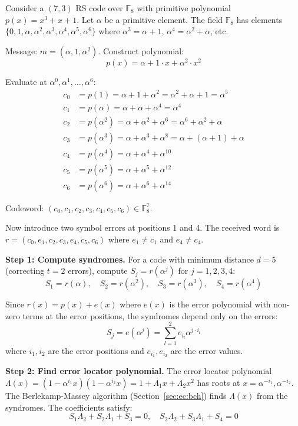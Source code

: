 \begin{example}
Consider a $(7,3)$ RS code over $\mathbb{F}_8$ with primitive polynomial $p(x) = x^3 + x + 1$. Let $\alpha$ be a primitive element. The field $\mathbb{F}_8$ has elements $\{0, 1, \alpha, \alpha^2, \alpha^3, \alpha^4, \alpha^5, \alpha^6\}$ where $\alpha^3 = \alpha + 1$, $\alpha^4 = \alpha^2 + \alpha$, etc.

Message: $m = (\alpha, 1, \alpha^2)$. Construct polynomial:
\[
p(x) = \alpha + 1\cdot x + \alpha^2 \cdot x^2
\]

Evaluate at $\alpha^0, \alpha^1, \dots, \alpha^6$:
\[
\begin{aligned}
c_0 &= p(1) = \alpha + 1 + \alpha^2 = \alpha^2 + \alpha + 1 = \alpha^5 \\
c_1 &= p(\alpha) = \alpha + \alpha + \alpha^4 = \alpha^4 \\
c_2 &= p(\alpha^2) = \alpha + \alpha^2 + \alpha^6 = \alpha^6 + \alpha^2 + \alpha \\
c_3 &= p(\alpha^3) = \alpha + \alpha^3 + \alpha^8 = \alpha + (\alpha+1) + \alpha \\
c_4 &= p(\alpha^4) = \alpha + \alpha^4 + \alpha^{10} \\
c_5 &= p(\alpha^5) = \alpha + \alpha^5 + \alpha^{12} \\
c_6 &= p(\alpha^6) = \alpha + \alpha^6 + \alpha^{14}
\end{aligned}
\]

Codeword: $(c_0, c_1, c_2, c_3, c_4, c_5, c_6) \in \mathbb{F}_8^7$.

Now introduce two symbol errors at positions 1 and 4. The received word is $r = (c_0, e_1, c_2, c_3, e_4, c_5, c_6)$ where $e_1 \neq c_1$ and $e_4 \neq c_4$.

\textbf{Step 1: Compute syndromes.} For a code with minimum distance $d = 5$ (correcting $t=2$ errors), compute $S_j = r(\alpha^j)$ for $j = 1, 2, 3, 4$:
\[
S_1 = r(\alpha),\quad S_2 = r(\alpha^2),\quad S_3 = r(\alpha^3),\quad S_4 = r(\alpha^4)
\]

Since $r(x) = p(x) + e(x)$ where $e(x)$ is the error polynomial with non-zero terms at the error positions, the syndromes depend only on the errors:
\[
S_j = e(\alpha^j) = \sum_{l=1}^2 e_{i_l} \alpha^{j \cdot i_l}
\]
where $i_1, i_2$ are the error positions and $e_{i_1}, e_{i_2}$ are the error values.

\textbf{Step 2: Find error locator polynomial.} The error locator polynomial $\Lambda(x) = (1 - \alpha^{i_1} x)(1 - \alpha^{i_2} x) = 1 + \Lambda_1 x + \Lambda_2 x^2$ has roots at $x = \alpha^{-i_1}, \alpha^{-i_2}$. The Berlekamp-Massey algorithm (Section~\ref{sec:ec:bch}) finds $\Lambda(x)$ from the syndromes. The coefficients satisfy:
\[
S_1 \Lambda_2 + S_2 \Lambda_1 + S_3 = 0,\quad
S_2 \Lambda_2 + S_3 \Lambda_1 + S_4 = 0
\]


\end{example}
